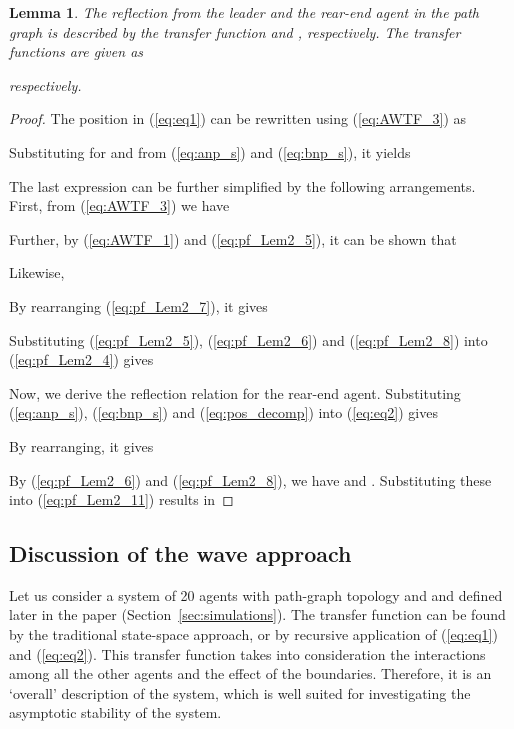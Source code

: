 \documentclass[10pt,twocolumn,twoside]{IEEEtran}
\newtheorem{lemma}{Lemma}
\theoremstyle{definition}
\begin{document}
\begin{lemma}\label{lem:refl}
  The reflection from the leader and the rear-end agent in the path graph is described by the transfer function  and , respectively. The transfer functions are given as
  
  respectively.
\end{lemma}
\begin{proof}
The position  in (\ref{eq:eq1}) can be rewritten using (\ref{eq:AWTF_3}) as

Substituting for  and  from (\ref{eq:anp_s}) and (\ref{eq:bnp_s}), it yields


The last expression can be further simplified by the following arrangements. First, from (\ref{eq:AWTF_3}) we have

Further, by (\ref{eq:AWTF_1}) and (\ref{eq:pf_Lem2_5}), it can be shown that

Likewise,

By rearranging (\ref{eq:pf_Lem2_7}), it gives

Substituting (\ref{eq:pf_Lem2_5}), (\ref{eq:pf_Lem2_6}) and (\ref{eq:pf_Lem2_8}) into (\ref{eq:pf_Lem2_4}) gives




Now, we derive the reflection relation for the rear-end agent. Substituting (\ref{eq:anp_s}), (\ref{eq:bnp_s}) and (\ref{eq:pos_decomp}) into (\ref{eq:eq2}) gives

By rearranging, it gives

By (\ref{eq:pf_Lem2_6}) and (\ref{eq:pf_Lem2_8}), we have  and . Substituting these into (\ref{eq:pf_Lem2_11}) results in


\end{proof}


\subsection{Discussion of the wave approach}\label{sec:wave_approach_discussion}


Let us consider a system of 20 agents with path-graph topology and  and  defined later in the paper (Section~\ref{sec:simulations}). The transfer function  can be found by the traditional state-space approach, or by recursive application of (\ref{eq:eq1}) and (\ref{eq:eq2}). This transfer function takes into consideration the interactions among all the other agents and the effect of the boundaries. Therefore, it is an `overall' description of the system, which is well suited for investigating the asymptotic stability of the system.
\end{document}
